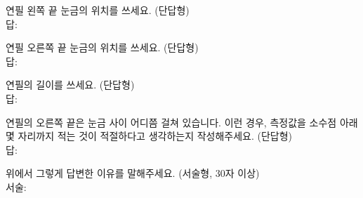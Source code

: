 \begin{graybox}\vspace*{0.2em}\bn
연필 왼쪽 끝 눈금의 위치를 쓰세요.
(단답형) \\ 답: 
\vspace*{0.4em}\end{graybox}\vspace{0.4em}

\begin{graybox}\vspace*{0.2em}\bn
연필 오른쪽 끝 눈금의 위치를 쓰세요.
(단답형) \\ 답: 
\vspace*{0.4em}\end{graybox}\vspace{0.4em}

\begin{graybox}\vspace*{0.2em}\bn
연필의 길이를 쓰세요.
(단답형) \\ 답: 
\vspace*{0.4em}\end{graybox}\vspace{0.4em}

\begin{graybox}\vspace*{0.2em}\bn
연필의 오른쪽 끝은 눈금 사이 어디쯤 걸쳐 있습니다.
이런 경우, 측정값을 소수점 아래 몇 자리까지 적는 것이
적절하다고 생각하는지 작성해주세요.
(단답형) \\ 답: 
\vspace*{0.4em}\end{graybox}\vspace{0.4em}

\begin{graybox}\vspace*{0.2em}\bn
위에서 그렇게 답변한 이유를 말해주세요.
(서술형, 30자 이상) \\ 서술: 
\vspace*{2.4em}\end{graybox}\vspace{0.4em}


\clearpage


\bnset
\begin{graybox}\centering
{\fontsize{14pt}{17pt}\selectfont\bd{\an
\ItemTitleiii
}}\vspace*{0.8em}\end{graybox}\vspace{0.4em}

